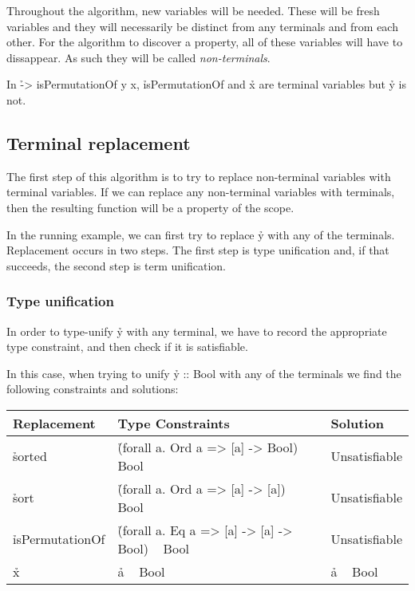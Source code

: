 \documentclass[a4paper, 11pt]{article}
\begin{document}
Throughout the algorithm, new variables will be needed.
These will be fresh variables and they will necessarily be distinct from any terminals and from each other.
For the algorithm to discover a property, all of these variables will have to dissappear.
As such they will be called \emph{non-terminals}.

\begin{ex}
  In \h{\x -> isPermutationOf y x}, \h{isPermutationOf} and \h{x} are terminal variables but \h{y} is not.
\end{ex}


\subsection{Terminal replacement}

The first step of this algorithm is to try to replace non-terminal variables with terminal variables.
If we can replace any non-terminal variables with terminals, then the resulting function will be a property of the scope.

In the running example, we can first try to replace \h{y} with any of the terminals.
Replacement occurs in two steps.
The first step is type unification and, if that succeeds, the second step is term unification.


\subsubsection{Type unification}

In order to type-unify \h{y} with any terminal, we have to record the appropriate type constraint, and then check if it is satisfiable.

In this case, when trying to unify \h{y :: Bool} with any of the terminals we find the following constraints and solutions:

\begin{tabular}{|l|l|l|}
  \hline
  Replacement & Type Constraints & Solution \\
  \hline
  \hline
  \h{sorted} & \h{(forall a. Ord a => [a] -> Bool) ~ Bool} & Unsatisfiable \\
  \hline
  \h{sort} & \h{(forall a. Ord a => [a] -> [a]) ~ Bool} & Unsatisfiable \\
  \hline
  \h{isPermutationOf} & \h{(forall a. Eq a => [a] -> [a] -> Bool) ~ Bool} & Unsatisfiable \\
  \hline
  \h{x} & \h{a ~ Bool} & \h{a ~ Bool} \\
  \hline
\end{tabular}
\end{document}
